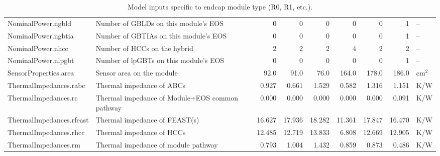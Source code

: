 \begin{table}[ht]
\begin{centering}
{\begin{tabular}{|l|l|r|r|r|r|r|r|l|}
NominalPower.ngbld        & Number of GBLDs on this module's EOS           &      0 &      0 &      0 &      0 &      0 &      1 & --     \\ 
NominalPower.ngbtia       & Number of GBTIAs on this module's EOS          &      0 &      0 &      0 &      0 &      0 &      1 & --     \\ 
NominalPower.nhcc         & Number of HCCs on the hybrid                   &      2 &      2 &      2 &      4 &      2 &      2 & --     \\ 
NominalPower.nlpgbt       & Number of lpGBTs on this module's EOS          &      0 &      0 &      0 &      0 &      0 &      1 & --     \\ 
SensorProperties.area     & Sensor area on the module                      &   92.0 &   91.0 &   76.0 &  164.0 &  178.0 &  186.0 & cm$^2$ \\ 
ThermalImpedances.rabc    & Thermal impedance of ABCs                      &  0.927 &  0.661 &  1.529 &  0.582 &  1.316 &  1.151 & K/W    \\ 
ThermalImpedances.rc      & Thermal impedance of Module+EOS common pathway &  0.000 &  0.000 &  0.000 &  0.000 &  0.000 &  0.091 & K/W    \\ 
ThermalImpedances.rfeast  & Thermal impedance of FEAST(s)                  & 16.627 & 17.936 & 18.282 & 11.361 & 17.847 & 16.470 & K/W    \\ 
ThermalImpedances.rhcc    & Thermal impedance of HCCs                      & 12.485 & 12.719 & 13.833 &  6.808 & 12.669 & 12.905 & K/W    \\ 
ThermalImpedances.rm      & Thermal impedance of module pathway            &  0.793 &  1.004 &  1.432 &  0.859 &  0.873 &  0.486 & K/W    \\ 
\hline\end{tabular}
} %
\end{centering}
\caption{Model inputs specific to endcap module type (R0, R1, etc.).}
\end{table}
